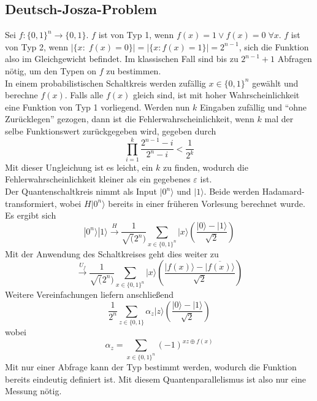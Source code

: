 \documentclass[a4paper, 12pt]{article}
\theoremstyle{plain}
\theoremstyle{definition}
\theoremstyle{lemma}
\theoremstyle{remark}
\theoremstyle{example}
\begin{document}
	\subsection{Deutsch-Josza-Problem}
	Sei $f:\{0,1\}^n \to \{0,1\}$. $f$ ist von Typ 1, wenn $f(x) = 1 \lor f(x) = 0 \; \forall x$. $f$ ist von Typ 2, wenn $\left|\{x: \; f(x) = 0\}\right| = \left|\{x: f(x) = 1\}\right| = 2^{n-1}$, sich die Funktion also im Gleichgewicht befindet. Im klassischen Fall sind bis zu $2^{n-1}+1$ Abfragen nötig, um den Typen on $f$ zu bestimmen.\\
	In einem probabilistischen Schaltkreis werden zufällig $x \in \{0,1\}^n$ gewählt und berechne $f(x)$. Falls alle $f(x)$ gleich sind, ist mit hoher Wahrscheinlichkeit eine Funktion von Typ 1 vorliegend. Werden nun $k$ Eingaben zufällig und ``ohne Zurücklegen'' gezogen, dann ist die Fehlerwahrscheinlichkeit, wenn $k$ mal der selbe Funktionswert zurückgegeben wird, gegeben durch \[\prod_{i=1}^{k} \frac{2^{n-1}-i}{2^n-i} < \frac{1}{2^k}\] Mit dieser Ungleichung ist es leicht, ein $k$ zu finden, wodurch die Fehlerwahrscheinlichkeit kleiner als ein gegebenes $\varepsilon$ ist.\\
	Der Quantenschaltkreis nimmt als Input $|0^n\rangle$ und $|1\rangle$. Beide werden Hadamard-transformiert, wobei $H|0^n\rangle$ bereits in einer früheren Vorlesung berechnet wurde. Es ergibt sich \[|0^n\rangle|1\rangle \overset{H}{\to} \frac{1}{\sqrt(2^n)} \sum_{x \in \{0,1\}^n} |x\rangle\left(\frac{|0\rangle-|1\rangle}{\sqrt{2}}\right)\]
	Mit der Anwendung des Schaltkreises geht dies weiter zu \[\overset{U_f}{\to} \frac{1}{\sqrt(2^n)} \sum_{x \in \{0,1\}^n} |x\rangle\left(\frac{|f(x)\rangle-\overline{|f(x)\rangle}}{\sqrt{2}}\right)\] Weitere Vereinfachungen liefern anschließend \[\frac{1}{2^n}\sum_{z \in \{0,1\}} \alpha_z |z\rangle\left(\frac{|0\rangle - |1\rangle}{\sqrt{2}}\right)\] wobei \[\alpha_z = \sum_{x \in \{0,1\}^n} (-1)^{xz\oplus f(x)}\] 
	Mit nur einer Abfrage kann der Typ bestimmt werden, wodurch die Funktion bereits eindeutig definiert ist. Mit diesem Quantenparallelismus ist also nur eine Messung nötig.
\end{document}
